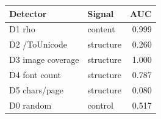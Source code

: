 \begin{tabular}{llr}
\toprule
Detector & Signal & AUC \\
\midrule
D1 rho & content & 0.999 \\
D2 /ToUnicode & structure & 0.260 \\
D3 image coverage & structure & 1.000 \\
D4 font count & structure & 0.787 \\
D5 chars/page & structure & 0.080 \\
D0 random & control & 0.517 \\
\bottomrule
\end{tabular}
